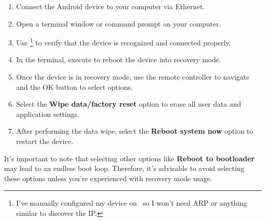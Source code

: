 \begin{enumerate}
    \item Connect the Android device to your computer via Ethernet.
    \item Open a terminal window or command prompt on your computer.
    \item Use \footnote{\label{tv-ip} I've manually configured my device on \taishanIP \ so I won't need ARP or anything similar to discover the IP.} to verify that the device is recognized and connected properly.
    \item In the terminal, execute  to reboot the device into recovery mode.
    \item Once the device is in recovery mode, use the remote controller to navigate and the OK button to select options.
    \item Select the \textbf{Wipe data/factory reset} option to erase all user data and application settings.
    \item After performing the data wipe, select the \textbf{Reboot system now} option to restart the device.
\end{enumerate}

It's important to note that selecting other options like \textbf{Reboot to bootloader} may lead to an endless boot loop. Therefore, it's advisable to avoid selecting these options unless you're experienced with recovery mode usage.




